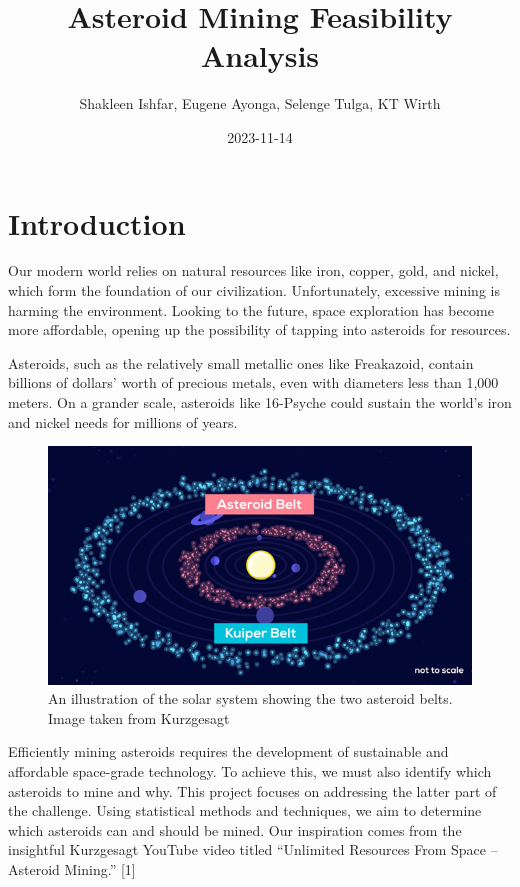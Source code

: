 \documentclass[
]{article}
\title{Asteroid Mining Feasibility Analysis}
\author{Shakleen Ishfar, Eugene Ayonga, Selenge Tulga, KT Wirth}
\date{2023-11-14}
\begin{document}
\maketitle

\hypertarget{introduction}{%
\section{Introduction}\label{introduction}}

Our modern world relies on natural resources like iron, copper, gold,
and nickel, which form the foundation of our civilization.
Unfortunately, excessive mining is harming the environment. Looking to
the future, space exploration has become more affordable, opening up the
possibility of tapping into asteroids for resources.

Asteroids, such as the relatively small metallic ones like Freakazoid,
contain billions of dollars' worth of precious metals, even with
diameters less than 1,000 meters. On a grander scale, asteroids like
16-Psyche could sustain the world's iron and nickel needs for millions
of years.

\begin{figure}
\centering
\includegraphics{./images/asteroid-belt.png}
\caption{An illustration of the solar system showing the two asteroid
belts. Image taken from Kurzgesagt}
\end{figure}

Efficiently mining asteroids requires the development of sustainable and
affordable space-grade technology. To achieve this, we must also
identify which asteroids to mine and why. This project focuses on
addressing the latter part of the challenge. Using statistical methods
and techniques, we aim to determine which asteroids can and should be
mined. Our inspiration comes from the insightful Kurzgesagt YouTube
video titled ``Unlimited Resources From Space -- Asteroid Mining.''
{[}1{]}
\end{document}
